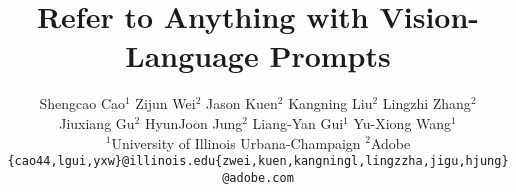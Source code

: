 \documentclass[10pt,twocolumn,letterpaper]{article}
\title{Refer to Anything with Vision-Language Prompts}
\author{%
Shengcao Cao$^1$ \quad Zijun Wei$^2$ \quad Jason Kuen$^2$ \quad Kangning Liu$^2$ \quad Lingzhi Zhang$^2$ \\
Jiuxiang Gu$^2$ \quad HyunJoon Jung$^2$ \quad Liang-Yan Gui$^1$ \quad Yu-Xiong Wang$^1$ \\
$^1$University of Illinois Urbana-Champaign \quad $^2$Adobe \\
{\small\texttt{\{cao44,lgui,yxw\}@illinois.edu\quad\{zwei,kuen,kangningl,lingzzha,jigu,hjung\}@adobe.com}}
}
\begin{document}
\maketitle















{
    
    
}


\end{document}
